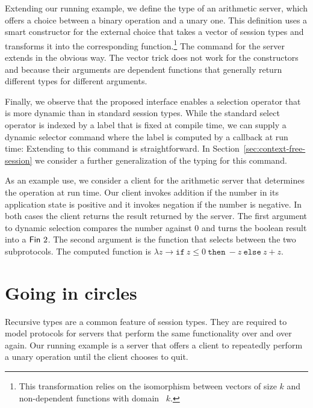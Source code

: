 \documentclass[acmsmall,screen]{acmart}
\begin{document}
Extending our running example, we define the type of an arithmetic server,
which offers a choice between a binary operation and a unary one. 
This definition uses a smart constructor {\Aamp} for the external choice that
takes a vector of session types and transforms it into the
corresponding function.\footnote{This transformation relies on the
  isomorphism between vectors of size $k$ and non-dependent functions with domain {\AFin~$k$}.}
\stExampleArithP
The command for the server extends in the obvious way. The vector
trick does not work for the {\ACommand} constructors {\ACSELECT} and
{\ACCHOICE} because their arguments are dependent functions that
generally return different types for different arguments.
\stArithpCommand

Finally, we observe that the proposed interface enables a
selection operator that is more dynamic than in standard session types. While the standard
select operator is indexed by a label that is fixed at compile time,
we can supply a dynamic selector command where the label is computed
by a callback  at run time:
\stDynamicBranchingCommand
Extending {\Aexecutor} to this command is straightforward.
In Section~\ref{sec:context-free-session} we consider a further
generalization of the typing for this command.

As an example use, we consider a client for the arithmetic server that
determines the operation at run time. Our client invokes addition if
the number in its application state is positive and it invokes
negation if the number is negative. In both cases the client returns
the result returned by the server.
\stArithpClient
The first argument to dynamic selection compares the number against
$0$ and turns the boolean result into a $\AFin~2$. The second argument
is the function that selects between the two subprotocols. The
computed function is $\lambda z \to \mathtt{if}\ z\le0\ \mathtt{then}\
-z\ \mathtt{else}\ z+z$. 

\section{Going in circles}
\label{sec:going-circles}


Recursive types are a common feature of session types. They are required
to model protocols for servers that perform the same functionality
over and over again. Our running example is a server that offers
a client to repeatedly perform a unary operation until the client
chooses to quit.
\end{document}
